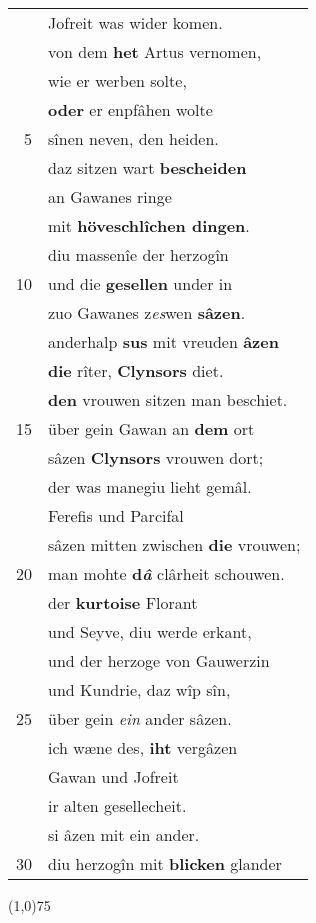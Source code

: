 \documentclass[8pt,a4paper,notitlepage]{article}
\begin{document}
\begin{table}[ht]
\begin{minipage}[t]{0.5\linewidth}
\begin{center}
\end{center}
\begin{tabular}{rl}
 & Jofreit was wider komen.\\ 
 & von dem \textbf{het} Artus vernomen,\\ 
 & wie er werben solte,\\ 
 & \textbf{oder} er enpfâhen wolte\\ 
5 & sînen neven, den heiden.\\ 
 & daz sitzen wart \textbf{bescheiden}\\ 
 & an Gawanes ringe\\ 
 & mit \textbf{höveschlîchen dingen}.\\ 
 & diu massenîe der herzogîn\\ 
10 & und die \textbf{gesellen} under in\\ 
 & zuo Gawanes z\textit{es}wen \textbf{sâzen}.\\ 
 & anderhalp \textbf{sus} mit vreuden \textbf{âzen}\\ 
 & \textbf{die} rîter, \textbf{Clynsors} diet.\\ 
 & \textbf{den} vrouwen sitzen man beschiet.\\ 
15 & über gein Gawan an \textbf{dem} ort\\ 
 & sâzen \textbf{Clynsors} vrouwen dort;\\ 
 & der was manegiu lieht gemâl.\\ 
 & Ferefis und Parcifal\\ 
 & sâzen mitten zwischen \textbf{die} vrouwen;\\ 
20 & man mohte \textbf{d\textit{â}} clârheit schouwen.\\ 
 & der \textbf{kurtoise} Florant\\ 
 & und Seyve, diu werde erkant,\\ 
 & und der herzoge von Gauwerzin\\ 
 & und Kundrie, daz wîp sîn,\\ 
25 & über gein \textit{ein} ander sâzen.\\ 
 & ich wæne des, \textbf{iht} vergâzen\\ 
 & Gawan und Jofreit\\ 
 & ir alten gesellecheit.\\ 
 & si âzen mit ein ander.\\ 
30 & diu herzogîn mit \textbf{blicken} glander\\ 
\end{tabular}
\scriptsize
\line(1,0){75} \newline

\end{minipage}
\end{table}
\end{document}
